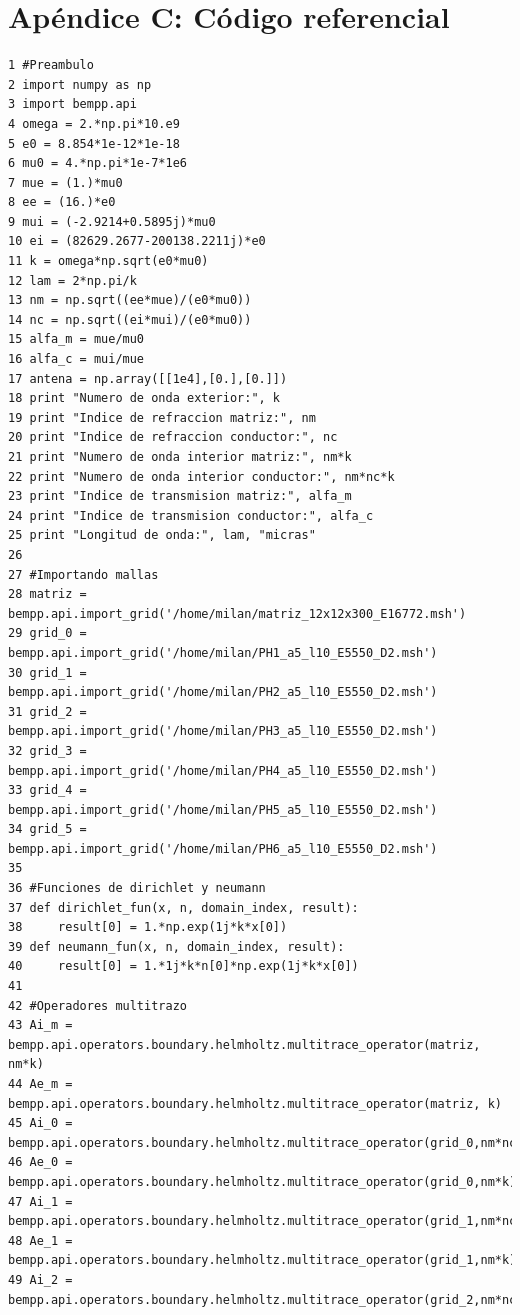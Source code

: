 \documentclass[12pt,letterpaper]{article}
\numberwithin{equation}{section}
\begin{document}
\part*{Apéndice C: Código referencial}
\setcounter{figure}{0}
\begin{lstlisting}
1 #Preambulo
2 import numpy as np
3 import bempp.api
4 omega = 2.*np.pi*10.e9
5 e0 = 8.854*1e-12*1e-18
6 mu0 = 4.*np.pi*1e-7*1e6
7 mue = (1.)*mu0
8 ee = (16.)*e0
9 mui = (-2.9214+0.5895j)*mu0
10 ei = (82629.2677-200138.2211j)*e0
11 k = omega*np.sqrt(e0*mu0)
12 lam = 2*np.pi/k
13 nm = np.sqrt((ee*mue)/(e0*mu0))
14 nc = np.sqrt((ei*mui)/(e0*mu0))
15 alfa_m = mue/mu0
16 alfa_c = mui/mue
17 antena = np.array([[1e4],[0.],[0.]])
18 print "Numero de onda exterior:", k
19 print "Indice de refraccion matriz:", nm
20 print "Indice de refraccion conductor:", nc
21 print "Numero de onda interior matriz:", nm*k
22 print "Numero de onda interior conductor:", nm*nc*k
23 print "Indice de transmision matriz:", alfa_m
24 print "Indice de transmision conductor:", alfa_c
25 print "Longitud de onda:", lam, "micras"
26 
27 #Importando mallas
28 matriz = bempp.api.import_grid('/home/milan/matriz_12x12x300_E16772.msh')
29 grid_0 = bempp.api.import_grid('/home/milan/PH1_a5_l10_E5550_D2.msh')
30 grid_1 = bempp.api.import_grid('/home/milan/PH2_a5_l10_E5550_D2.msh')
31 grid_2 = bempp.api.import_grid('/home/milan/PH3_a5_l10_E5550_D2.msh')
32 grid_3 = bempp.api.import_grid('/home/milan/PH4_a5_l10_E5550_D2.msh')
33 grid_4 = bempp.api.import_grid('/home/milan/PH5_a5_l10_E5550_D2.msh')
34 grid_5 = bempp.api.import_grid('/home/milan/PH6_a5_l10_E5550_D2.msh')
35 
36 #Funciones de dirichlet y neumann
37 def dirichlet_fun(x, n, domain_index, result):
38     result[0] = 1.*np.exp(1j*k*x[0])
39 def neumann_fun(x, n, domain_index, result):
40     result[0] = 1.*1j*k*n[0]*np.exp(1j*k*x[0])
41 
42 #Operadores multitrazo
43 Ai_m = bempp.api.operators.boundary.helmholtz.multitrace_operator(matriz, nm*k)
44 Ae_m = bempp.api.operators.boundary.helmholtz.multitrace_operator(matriz, k)
45 Ai_0 = bempp.api.operators.boundary.helmholtz.multitrace_operator(grid_0,nm*nc*k)
46 Ae_0 = bempp.api.operators.boundary.helmholtz.multitrace_operator(grid_0,nm*k)
47 Ai_1 = bempp.api.operators.boundary.helmholtz.multitrace_operator(grid_1,nm*nc*k)
48 Ae_1 = bempp.api.operators.boundary.helmholtz.multitrace_operator(grid_1,nm*k)
49 Ai_2 = bempp.api.operators.boundary.helmholtz.multitrace_operator(grid_2,nm*nc*k)

\end{lstlisting}
\end{document}
